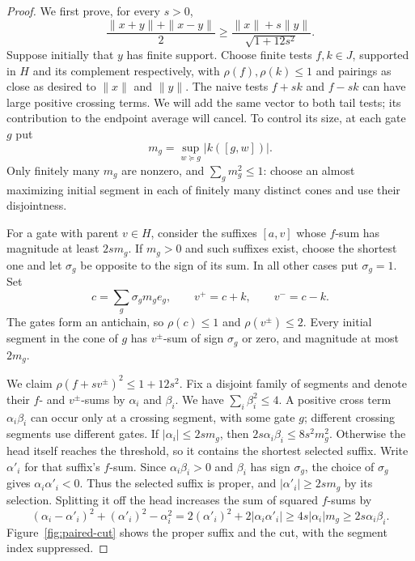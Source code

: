 \begin{proof}
We first prove, for every $s>0$,
\begin{equation}\label{eq:paired-parameter}
 \frac{\|x+y\|+\|x-y\|}{2}
 \ge\frac{\|x\|+s\|y\|}{\sqrt{1+12s^2}}.
\end{equation}
Suppose initially that $y$ has finite support. Choose finite tests
$f,k\in J$, supported in $H$ and its complement respectively, with
$\rho(f),\rho(k)\le1$ and pairings as close as desired to $\|x\|$ and
$\|y\|$. The naive tests $f+sk$ and $f-sk$ can have large positive crossing
terms. We will add the same vector to both tail tests; its contribution
to the endpoint average will cancel. To control its size, at each gate
$g$ put
\[
 m_g=\sup_{w\succeq g}|k([g,w])|.
\]
Only finitely many $m_g$ are nonzero, and $\sum_gm_g^2\le1$:
choose an almost maximizing initial segment in each of finitely many
distinct cones and use their disjointness.

For a gate with parent $v\in H$, consider the suffixes $[a,v]$ whose
$f$-sum has magnitude at least $2sm_g$. If $m_g>0$ and such suffixes
exist, choose the shortest one and let $\sigma_g$ be opposite to the
sign of its sum. In all other cases put $\sigma_g=1$. Set
\[
 c=\sum_g\sigma_gm_ge_g,\qquad v^+=c+k,\qquad v^-=c-k.
\]
The gates form an antichain, so $\rho(c)\le1$ and $\rho(v^\pm)\le2$.
Every initial segment in the cone of $g$ has $v^\pm$-sum of sign
$\sigma_g$ or zero, and magnitude at most $2m_g$.

We claim $\rho(f+sv^\pm)^2\le1+12s^2$. Fix a disjoint family of
segments and denote their $f$- and $v^\pm$-sums by $\alpha_i$ and
$\beta_i$. We have $\sum_i\beta_i^2\le4$. A positive cross term
$\alpha_i\beta_i$ can occur only at a crossing segment, with some
gate $g$; different crossing segments use different gates. If
$|\alpha_i|\le2sm_g$, then $2s\alpha_i\beta_i\le8s^2m_g^2$.
Otherwise the head itself reaches the threshold, so it contains the
shortest selected suffix. Write $\alpha'_i$ for that suffix's $f$-sum.
Since $\alpha_i\beta_i>0$ and $\beta_i$ has sign $\sigma_g$, the choice
of $\sigma_g$ gives $\alpha_i\alpha'_i<0$. Thus the selected suffix is
proper, and $|\alpha'_i|\ge2sm_g$ by its selection.
Splitting it off the head increases the sum of squared $f$-sums by
\[
 (\alpha_i-\alpha'_i)^2+(\alpha'_i)^2-\alpha_i^2
 =2(\alpha'_i)^2+2|\alpha_i\alpha'_i|
 \ge4s|\alpha_i|m_g\ge2s\alpha_i\beta_i.
\]
Figure~\ref{fig:paired-cut} shows the proper suffix and the cut,
with the segment index suppressed.



\end{proof}
